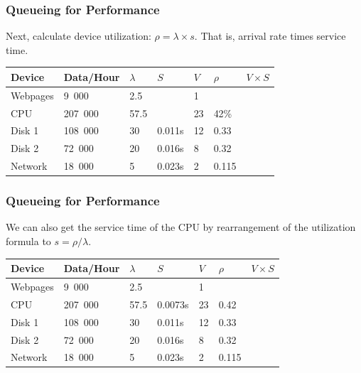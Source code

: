 \begin{frame}
\frametitle{Queueing for Performance}

Next, calculate device utilization: $\rho = \lambda \times s$. That is, arrival rate times service time.

\begin{center}
\begin{tabular}{|l|l|l|l|l|l|l|} \hline
	\textbf{Device} & \textbf{Data/Hour} & \textbf{$\lambda$} & \textbf{$S$} & \textbf{$V$} & \textbf{$\rho$} & \textbf{$V \times S$} \\ \hline
	Webpages & 9~000 & 2.5 & & 1 & & \\ \hline
	CPU & 207~000 & 57.5 &  & 23 & 42\% & \\ \hline
	Disk 1 & 108~000 & 30 & 0.011s  & 12& 0.33 &\\ \hline
	Disk 2 & 72~000 & 20 & 0.016s & 8 & 0.32 &\\ \hline
	Network & 18~000 & 5 & 0.023s & 2 & 0.115 &\\ \hline
\end{tabular}
\end{center}

\end{frame}



\begin{frame}
\frametitle{Queueing for Performance}

We can also get the service time of the CPU by rearrangement of the utilization formula to $s = \rho / \lambda$.

\begin{center}
\begin{tabular}{|l|l|l|l|l|l|l|} \hline
	\textbf{Device} & \textbf{Data/Hour} & \textbf{$\lambda$} & \textbf{$S$} & \textbf{$V$} & \textbf{$\rho$} & \textbf{$V \times S$} \\ \hline
	Webpages & 9~000 & 2.5 & & 1 & & \\ \hline
	CPU & 207~000 & 57.5 & 0.0073s & 23 & 0.42 & \\ \hline
	Disk 1 & 108~000 & 30 & 0.011s  & 12& 0.33 &\\ \hline
	Disk 2 & 72~000 & 20 & 0.016s & 8 & 0.32 &\\ \hline
	Network & 18~000 & 5 & 0.023s & 2 & 0.115 &\\ \hline
\end{tabular}
\end{center}

\end{frame}



